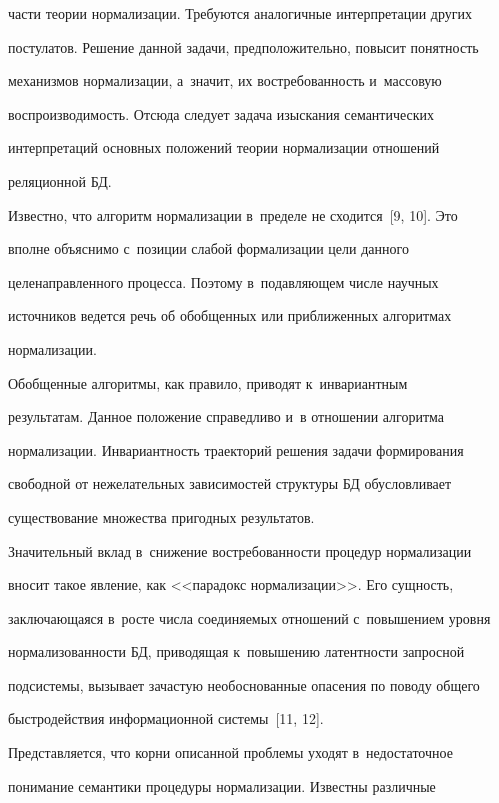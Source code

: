 части теории нормализации. Требуются аналогичные интерпретации других 

постулатов. Решение данной задачи, предположительно, повысит понятность 

механизмов нормализации, а~значит, их востребованность и~массовую 

воспроизводимость. Отсюда следует задача изыскания семантических 

интерпретаций основных положений теории нормализации отношений 

реляционной БД. 

  

  Известно, что алгоритм нормализации в~пределе не сходится~[9, 10]. Это 

вполне объяснимо с~позиции слабой формализации цели данного 

целенаправленного процесса. Поэтому в~подавляющем числе научных 

источников ведется речь об обобщенных или приближенных алгоритмах 

нормализации.

  

  Обобщенные алгоритмы, как правило, приводят к~инвариантным 

результатам. Данное положение справедливо и~в отношении алгоритма 

нормализации. Инвариантность траекторий решения задачи формирования 

свободной от нежелательных зависимостей структуры БД обусловливает 

существование множества пригодных результатов. 

  

  Значительный вклад в~снижение востребованности процедур нормализации 

вносит такое явление, как <<парадокс нормализации>>. Его сущность, 

заключающаяся в~росте числа соединяемых отношений с~повышением уровня 

нормализованности БД, приводящая к~повышению латентности запросной 

подсистемы, вызывает зачастую необоснованные опасения по поводу общего 

быстродействия информационной системы~[11, 12]. 

  

  Представляется, что корни описанной проблемы уходят в~недостаточное 

понимание семантики процедуры нормализации. Известны различные 

